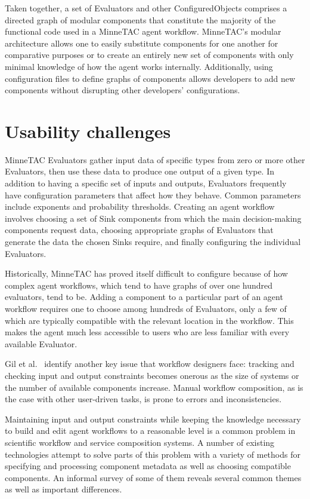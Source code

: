 \documentclass{article}
\begin{document}
Taken together, a set of Evaluators and other ConfiguredObjects comprises
a directed graph of modular components that constitute the majority
of the functional code used in a MinneTAC agent workflow.  MinneTAC's
modular architecture allows one to easily substitute components for one
another for comparative purposes or to create an entirely new set of
components with only minimal knowledge of how the agent works internally.
Additionally, using configuration files to define graphs of components
allows developers to add new components without disrupting other
developers' configurations.

\section{Usability challenges}
\label{sec:challenges}

MinneTAC Evaluators gather input data of specific types from zero or
more other Evaluators, then use these data to produce one output of a
given type.  In addition to having a specific set of inputs and outputs,
Evaluators frequently have configuration parameters that affect how they
behave.  Common parameters include exponents and probability thresholds.
Creating an agent workflow involves choosing a set of Sink components
from which the main decision-making components request data, choosing
appropriate graphs of Evaluators that generate the data the chosen Sinks
require, and finally configuring the individual Evaluators.~\cite{Collins08TR}

Historically, MinneTAC has proved itself difficult to configure because of
how complex agent workflows, which tend to have graphs of over one hundred
evaluators, tend to be.  Adding a component to a particular part of an agent workflow requires one to choose among hundreds of Evaluators, only a few of which are typically compatible with the relevant location in the workflow.
This makes the agent much less accessible
to users who are less familiar with every available Evaluator.

Gil et al.~\cite{gil2010wings} identify another key issue that workflow
designers face: tracking and checking input and output constraints
becomes onerous as the size of systems or the number of available
components increase.  Manual workflow composition, as is the case
with other user-driven tasks, is prone to errors and inconsistencies.

Maintaining input and output constraints while keeping the knowledge
necessary to build and edit agent workflows to a reasonable level
is a common problem in
scientific workflow and service composition systems.  A number of
existing technologies attempt to solve parts of this problem with a
variety of methods for specifying and processing component metadata as
well as choosing compatible components.  An informal survey of some of
them reveals several common themes as well as important differences.
\end{document}
